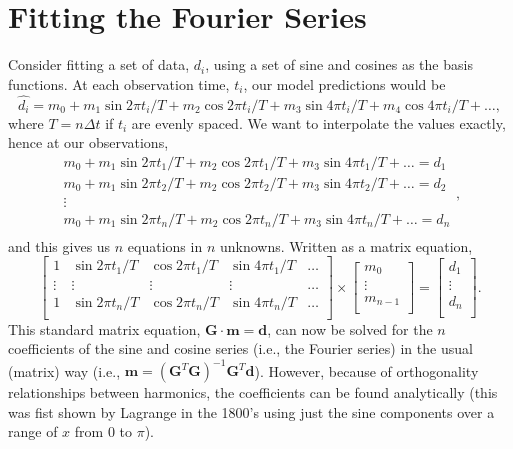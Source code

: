 \section{Fitting the Fourier Series}
\label{sec:FFS}
Consider fitting a set of data, $d_i$, using a set of sine and cosines as the basis functions.
At each observation time, $t_i$, our model predictions would be
\begin{equation}
\hat{d_i} = m_0 + m_1 \sin 2 \pi t_i/T + m_2 \cos 2 \pi t_i/T + m_3 \sin 4 \pi t_i/T + m_4 \cos 4 \pi t_i/T + \dots,
\end{equation}
where $T = n \Delta t$ if   $t_i$ are evenly spaced.  We want to interpolate the values exactly, hence at our observations,
\begin{equation}
\begin{array}{c}
m_0 + m_1 \sin 2 \pi t_1/T + m_2 \cos 2 \pi t_1/T + m_3 \sin 4 \pi t_1/T + \dots = d_1\\
m_0 + m_1 \sin 2 \pi t_2/T + m_2 \cos 2 \pi t_2/T + m_3 \sin 4 \pi t_2/T + \dots = d_2\\
\vdots\\
m_0 + m_1 \sin 2 \pi t_n/T + m_2 \cos 2 \pi t_n/T + m_3 \sin 4 \pi t_n/T + \dots = d_n\\
\end{array},
\end{equation}
and this gives us $n$ equations in $n$ unknowns.  Written as a matrix equation,
\begin{equation}
\left [ \begin{array}{ccccc}
1 & \sin 2 \pi t_1/T &  \cos 2 \pi t_1/T & \sin 4 \pi t_1/T & \dots \\
\vdots & \vdots & \vdots & \vdots & \dots \\        
1 & \sin 2 \pi t_n/T & \cos 2 \pi t_n/T & \sin 4 \pi t_n/T   & \dots \\
\end{array} \right ]
\times 
\left[ \begin{array}{c}
m_0 \\
\vdots \\
m_{n-1} \\
\end{array} \right]
=
\left[ \begin{array}{c}
d_1\\
\vdots\\
d_n \\
\end{array} \right] .
\end{equation}
This standard matrix equation, $\mathbf{G\cdot m = d}$, can now be solved for the $n$ coefficients of the sine and cosine 
series (i.e., the Fourier series) in the usual (matrix) way (i.e., $\mathbf{m} = (\mathbf{G}^T\mathbf{G})^{-1}\mathbf{G}^T\mathbf{d}$).
However, because of orthogonality 
relationships between harmonics, the coefficients can be found analytically (this was fist shown 
by Lagrange in the 1800's using just the sine components over a range of $x$ from 0 to $\pi$).
	
